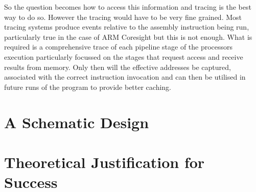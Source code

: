 So the question becomes how to access this information and tracing is the best way to do so. However the tracing would have to be very fine grained. Most tracing systems produce events relative to the assembly instruction being run, particularly true in the case of ARM Coresight but this is not enough. What is required is a comprehensive trace of each pipeline stage of the processors execution particularly focussed on the stages that request access and receive results from memory. Only then will the effective addresses be captured, associated with the correct instruction invocation and can then be utilised in future runs of the program to provide better caching.

\section{A Schematic Design}

\section{Theoretical Justification for Success}